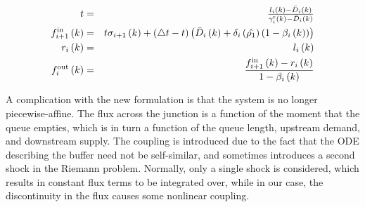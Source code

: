 \begin{eqnarray*}
t & = & \mbox{\ensuremath{\frac{l_{i}\left(k\right)-\bar{D}_{i}\left(k\right)}{\gamma^{\text{r}}_{i}\left(k\right)-\bar{D}_{i}\left(k\right)}}}\\
f_{i+1}^{\text{in}}\left(k\right) & = & t\sigma_{i+1}\left(k\right)+\left(\triangle t-t\right)\left(\bar{D}_{i}\left(k\right)+\delta_{i}\left(\hat{\rho_{1}}\right)\left(1-\beta_{i}\left(k\right)\right)\right)\\
r_{i}\left(k\right) & = & l_{i}\left(k\right)\\
f_{i}^{\text{out}}\left(k\right) & = & \frac{f_{i+1}^{\text{in}}\left(k\right)-r_{i}\left(k\right)}{1-\beta_{i}\left(k\right)}
\end{eqnarray*}


A complication with the new formulation is that the system is no longer
piecewise-affine. The flux across the junction is a function of the
moment that the queue empties, which is in turn a function of the
queue length, upstream demand, and downstream supply. The coupling
is introduced due to the fact that the ODE describing the buffer need
not be self-similar, and sometimes introduces a second shock in the
Riemann problem. Normally, only a single shock is considered, which
results in constant flux terms to be integrated over, while in our
case, the discontinuity in the flux causes some nonlinear coupling.
